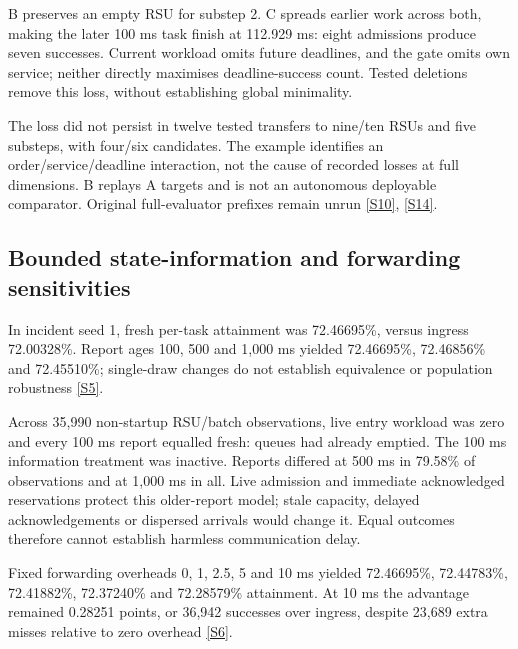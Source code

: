 \documentclass[11pt,a4paper]{article}
\begin{document}
B preserves an empty RSU for substep 2. C spreads earlier work across both, making the later 100 ms task finish at 112.929 ms: eight admissions produce seven successes. Current workload omits future deadlines, and the gate omits own service; neither directly maximises deadline-success count. Tested deletions remove this loss, without establishing global minimality.

The loss did not persist in twelve tested transfers to nine/ten RSUs and five substeps, with four/six candidates. The example identifies an order/service/deadline interaction, not the cause of recorded losses at full dimensions. B replays A targets and is not an autonomous deployable comparator. Original full-evaluator prefixes remain unrun \hyperref[source-s10]{[S10]}, \hyperref[source-s14]{[S14]}.

\subsection{Bounded state-information and forwarding sensitivities}\label{sec:3.5}

In incident seed 1, fresh per-task attainment was 72.46695\%, versus ingress 72.00328\%. Report ages 100, 500 and 1,000 ms yielded 72.46695\%, 72.46856\% and 72.45510\%; single-draw changes do not establish equivalence or population robustness \hyperref[source-s5]{[S5]}.

Across 35,990 non-startup RSU/batch observations, live entry workload was zero and every 100 ms report equalled fresh: queues had already emptied. The 100 ms information treatment was inactive. Reports differed at 500 ms in 79.58\% of observations and at 1,000 ms in all. Live admission and immediate acknowledged reservations protect this older-report model; stale capacity, delayed acknowledgements or dispersed arrivals would change it. Equal outcomes therefore cannot establish harmless communication delay.

Fixed forwarding overheads 0, 1, 2.5, 5 and 10 ms yielded 72.46695\%, 72.44783\%, 72.41882\%, 72.37240\% and 72.28579\% attainment. At 10 ms the advantage remained 0.28251 points, or 36,942 successes over ingress, despite 23,689 extra misses relative to zero overhead \hyperref[source-s6]{[S6]}.
\end{document}
